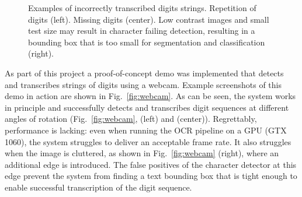 \documentclass[11pt]{article}
\begin{document}
\begin{figure}[ht]
    \centering
    \caption{
      Examples of incorrectly transcribed digits strings. Repetition of digits (left).
      Missing digits (center). Low contrast images and small test size may result in character failing detection,
      resulting in a bounding box that is too small for segmentation and classification (right).
    }
    \label{fig:bad_examples_pipeline}
\end{figure}

As part of this project a proof-of-concept demo was implemented that detects and transcribes
strings of digits using a webcam. Example screenshots of this demo in action are shown in Fig.~\ref{fig:webcam}. As can be seen,
the system works in principle and successfully detects and transcribes digit sequences at
different angles of rotation (Fig.~\ref{fig:webcam}, (left) and (center)).
Regrettably, performance is lacking: even when running the OCR pipeline on a GPU (GTX 1060), the system struggles to deliver an acceptable frame rate.
It also struggles when the image is cluttered, as shown in Fig.~\ref{fig:webcam} (right), where
an additional edge is introduced. The false positives of the character detector at this edge
prevent the system from finding a text bounding box that is tight enough to enable successful transcription
of the digit sequence.
\end{document}
